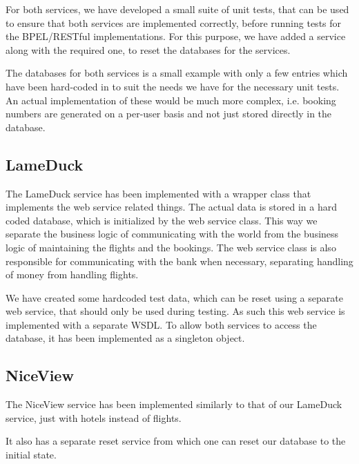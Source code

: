For both services, we have developed a small suite of unit tests, that can be used to ensure that both services are implemented correctly, before running tests for the BPEL/RESTful implementations. For this purpose, we have added a service along with the required one, to reset the databases for the services.\medskip

The databases for both services is a small example with only a few entries which have been hard-coded in to suit the needs we have for the necessary unit tests. An actual implementation of these would be much more complex, i.e. booking numbers are generated on a per-user basis and not just stored directly in the database.

\subsection{LameDuck}
\mrb

\noindent
The LameDuck service has been implemented with a wrapper class that implements the web service related things. The actual data is stored in a hard coded database, which is initialized by the web service class. This way we separate the business logic of communicating with the world from the business logic of maintaining the flights and the bookings. The web service class is also responsible for communicating with the bank when necessary, separating handling of money from handling flights.

We have created some hardcoded test data, which can be reset using a separate web service, that should only be used during testing. As such this web service is implemented with a separate WSDL. To allow both services to access the database, it has been implemented as a singleton object.


\subsection{NiceView}
\mkt

\noindent
The NiceView service has been implemented similarly to that of our LameDuck service, just with hotels instead of flights.

It also has a separate reset service from which one can reset our database to the initial state.


